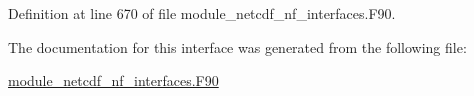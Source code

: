 Definition at line 670 of file module\+\_\+netcdf\+\_\+nf\+\_\+interfaces.\+F90.



The documentation for this interface was generated from the following file\+:\begin{DoxyCompactItemize}
\item 
\hyperlink{module__netcdf__nf__interfaces_8F90}{module\+\_\+netcdf\+\_\+nf\+\_\+interfaces.\+F90}\end{DoxyCompactItemize}

